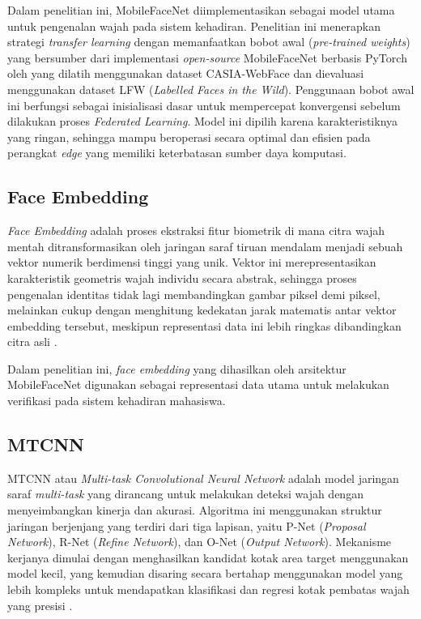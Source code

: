 Dalam penelitian ini, MobileFaceNet diimplementasikan sebagai model utama untuk pengenalan wajah pada sistem kehadiran. Penelitian ini menerapkan strategi \textit{transfer learning} dengan memanfaatkan bobot awal (\textit{pre-trained weights}) yang bersumber dari implementasi \textit{open-source} MobileFaceNet berbasis PyTorch oleh \textcite{Xiaoccer2023} yang dilatih menggunakan dataset CASIA-WebFace dan dievaluasi menggunakan dataset LFW (\textit{Labelled Faces in the Wild}). Penggunaan bobot awal ini berfungsi sebagai inisialisasi dasar untuk mempercepat konvergensi sebelum dilakukan proses \textit{Federated Learning}. Model ini dipilih karena karakteristiknya yang ringan, sehingga mampu beroperasi secara optimal dan efisien pada perangkat \textit{edge} yang memiliki keterbatasan sumber daya komputasi.

\subsection{Face Embedding}
\label{subsec:face-embedding-teori}

\textit{Face Embedding} adalah proses ekstraksi fitur biometrik di mana citra wajah mentah ditransformasikan oleh jaringan saraf tiruan mendalam menjadi sebuah vektor numerik berdimensi tinggi yang unik. Vektor ini merepresentasikan karakteristik geometris wajah individu secara abstrak, sehingga proses pengenalan identitas tidak lagi membandingkan gambar piksel demi piksel, melainkan cukup dengan menghitung kedekatan jarak matematis antar vektor embedding tersebut, meskipun representasi data ini lebih ringkas dibandingkan citra asli \parencite{Shahreza2025}.

Dalam penelitian ini, \textit{face embedding} yang dihasilkan oleh arsitektur MobileFaceNet digunakan sebagai representasi data utama untuk melakukan verifikasi pada sistem kehadiran mahasiswa.

\subsection{MTCNN}
\label{subsec:mtcnn-teori}

MTCNN atau \textit{Multi-task Convolutional Neural Network} adalah model jaringan saraf \textit{multi-task} yang dirancang untuk melakukan deteksi wajah dengan menyeimbangkan kinerja dan akurasi. Algoritma ini menggunakan struktur jaringan berjenjang yang terdiri dari tiga lapisan, yaitu P-Net (\textit{Proposal Network}), R-Net (\textit{Refine Network}), dan O-Net (\textit{Output Network}). Mekanisme kerjanya dimulai dengan menghasilkan kandidat kotak area target menggunakan model kecil, yang kemudian disaring secara bertahap menggunakan model yang lebih kompleks untuk mendapatkan klasifikasi dan regresi kotak pembatas wajah yang presisi \parencite{Zhang2020}.

